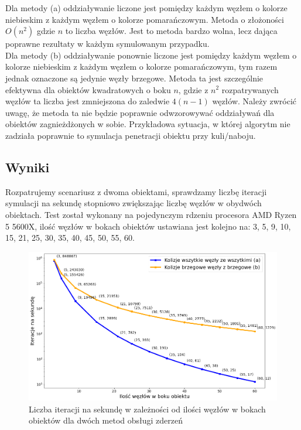 \documentclass[12pt, letterpaper]{report}
\begin{document}
    Dla metody (a) oddziaływanie liczone jest pomiędzy każdym węzłem o kolorze 
    niebieskim z każdym węzłem o
    kolorze pomarańczowym. Metoda o złożoności $O(n^2)$ gdzie $n$ to liczba węzłów.
    Jest to metoda bardzo wolna, lecz dająca poprawne rezultaty w każdym symulowanym przypadku.\\

    Dla metody (b) oddziaływanie ponownie liczone jest pomiędzy każdym węzłem o kolorze niebieskim z każdym
    węzłem o kolorze pomarańczowym, tym razem jednak oznaczone są jedynie węzły brzegowe.
    Metoda ta jest szczególnie efektywna dla obiektów kwadratowych o boku $n$, gdzie z $n^2$
    rozpatrywanych węzłów ta liczba jest zmniejszona do zaledwie $4(n-1)$ węzłów.
    Należy zwrócić uwagę, że metoda ta nie będzie poprawnie odwzorowywać oddziaływań dla
    obiektów zagnieżdżonych w sobie. Przykładowa sytuacja, w której algorytm nie zadziała poprawnie
    to symulacja penetracji obiektu przy kuli/naboju.

    \newpage
    \subsection{Wyniki}
    Rozpatrujemy scenariusz z dwoma obiektami, sprawdzamy liczbę iteracji symulacji na sekundę stopniowo
    zwiększając liczbę węzłów w obydwóch obiektach. Test został wykonany na pojedynczym rdzeniu procesora AMD Ryzen 5 5600X, 
    ilość węzłów w bokach obiektów ustawiana jest kolejno na: 3, 5, 9, 10, 15, 21, 25, 30, 35, 40, 45, 50, 55, 60.

    \begin{figure}[h]
        \centering
        \includegraphics[width=15cm]{performance_side_size}
        \caption{
            Liczba iteracji na sekundę w zależności od 
            ilości węzłów w bokach obiektów dla dwóch metod obsługi zderzeń
        }
    \end{figure}
\end{document}
